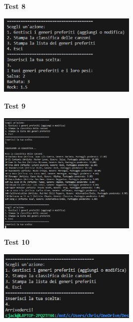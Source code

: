 \documentclass[a4paper,11pt]{article}
\begin{document}
\newpage
\begin{center}
    \textbf{Test 8}
    \par
    \vspace{0.5cm}
    \includegraphics[width=0.5\textwidth]{ptest8}
\end{center}
\begin{center}
    \textbf{Test 9}
    \par
    \vspace{0.5cm}
    \includegraphics[width=0.5\textwidth]{ptest9}
\end{center}
\begin{center}
    \textbf{Test 10}
    \par
    \vspace{0.5cm}
    \includegraphics[width=0.5\textwidth]{ptest10}
\end{center}
\vspace{1cm}
\end{document}
